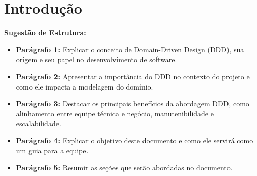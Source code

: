 \section{Introdução}


\textbf{Sugestão de Estrutura:}

\begin{itemize}
    \item \textbf{Parágrafo 1:} Explicar o conceito de Domain-Driven Design (DDD), sua origem e seu papel no desenvolvimento de software.
    \item \textbf{Parágrafo 2:} Apresentar a importância do DDD no contexto do projeto e como ele impacta a modelagem do domínio.
    \item \textbf{Parágrafo 3:} Destacar os principais benefícios da abordagem DDD, como alinhamento entre equipe técnica e negócio, manutenibilidade e escalabilidade.
    \item \textbf{Parágrafo 4:} Explicar o objetivo deste documento e como ele servirá como um guia para a equipe.
    \item \textbf{Parágrafo 5:} Resumir as seções que serão abordadas no documento.
\end{itemize}

